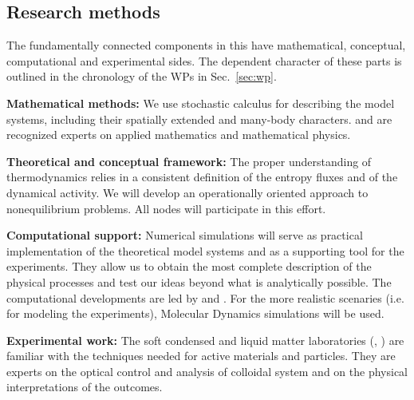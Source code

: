\subsection{Research methods}\label{sec:methods}

The fundamentally connected components in this \TheProject have mathematical, conceptual,
computational and experimental sides. The dependent character of these parts is outlined in
the chronology of the WPs in Sec.~\ref{sec:wp}.

\begin{asparaenum}
\item {\bf Mathematical methods:} We use stochastic calculus for describing the model
systems, including their spatially extended and many-body characters.
%
 and  are recognized experts on applied mathematics and
mathematical physics.
\item {\bf Theoretical and conceptual framework:} The proper understanding of thermodynamics
relies in a consistent definition of the entropy fluxes and of the dynamical activity.
%
We will develop an operationally oriented approach to nonequilibrium problems.
%
All nodes will participate in this effort.
\item {\bf Computational support:} Numerical simulations will serve as practical
implementation of the theoretical model systems and as a supporting tool for the
experiments.
%
They allow us to obtain the most complete description of the physical processes and test our ideas beyond what is analytically possible.
%
The computational developments are led by  and .
%
For the more realistic scenaries (i.e. for modeling the experiments), Molecular Dynamics
simulations will be used.
\item {\bf Experimental work:} The soft condensed and liquid matter laboratories
(, ) are familiar with the techniques needed for active materials
and particles.
%
They are experts on the optical control and analysis of colloidal system and on the physical interpretations of the outcomes.
\end{asparaenum}

